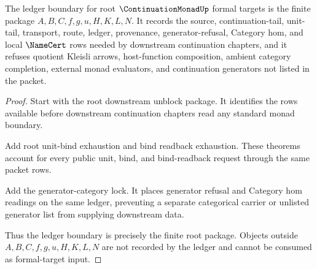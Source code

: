 \begin{theorem}
\label{thm:continuation-monad-root-ledger-formal-boundary}
The ledger boundary for root $\ContinuationMonadUp$ formal targets is the finite package $A,B,C,f,g,u,H,K,L,N$. It records the source, continuation-tail, unit-tail, transport, route, ledger, provenance, generator-refusal, Category hom, and local $\NameCert$ rows needed by downstream continuation chapters, and it refuses quotient Kleisli arrows, host-function composition, ambient category completion, external monad evaluators, and continuation generators not listed in the packet.
\end{theorem}
\begin{proof}
Start with the root downstream unblock package. It identifies the rows available before downstream continuation chapters read any standard monad boundary.

Add root unit-bind exhaustion and bind readback exhaustion. These theorems account for every public unit, bind, and bind-readback request through the same packet rows.

Add the generator-category lock. It places generator refusal and Category hom readings on the same ledger, preventing a separate categorical carrier or unlisted generator list from supplying downstream data.

Thus the ledger boundary is precisely the finite root package. Objects outside $A,B,C,f,g,u,H,K,L,N$ are not recorded by the ledger and cannot be consumed as formal-target input.
\end{proof}

